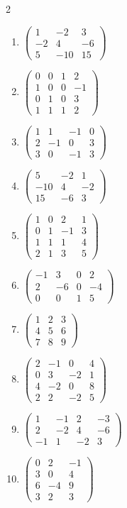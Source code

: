 \begin{multicols}{2}
\begin{enumerate}[label=\arabic*.,  leftmargin=*]
\item $\begin{pmatrix}1&-2&3\\-2&4&-6\\5&-10&15\end{pmatrix}$
\item $\begin{pmatrix}0&0&1&2\\1&0&0&-1\\0&1&0&3\\1&1&1&2\end{pmatrix}$
\item $\begin{pmatrix}1&1&-1&0\\2&-1&0&3\\3&0&-1&3\end{pmatrix}$
\item $\begin{pmatrix}5&-2&1\\-10&4&-2\\15&-6&3\end{pmatrix}$
\item $\begin{pmatrix}1&0&2&1\\0&1&-1&3\\1&1&1&4\\2&1&3&5\end{pmatrix}$
\item $\begin{pmatrix}-1&3&0&2\\2&-6&0&-4\\0&0&1&5\end{pmatrix}$
\item $\begin{pmatrix}1&2&3\\4&5&6\\7&8&9\end{pmatrix}$
\item $\begin{pmatrix}2&-1&0&4\\0&3&-2&1\\4&-2&0&8\\2&2&-2&5\end{pmatrix}$
\item $\begin{pmatrix}1&-1&2&-3\\2&-2&4&-6\\-1&1&-2&3\end{pmatrix}$
\item $\begin{pmatrix}0&2&-1\\3&0&4\\6&-4&9\\3&2&3\end{pmatrix}$

\end{enumerate}
\end{multicols}
